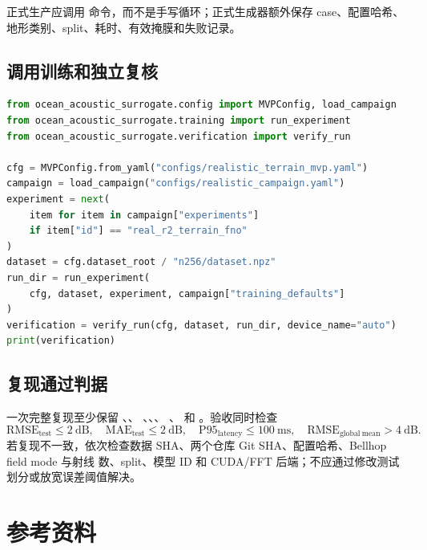 \documentclass[UTF8,11pt]{ctexart}
\newcommand{\RMSE}{\mathrm{RMSE}}
\begin{document}
正式生产应调用  命令，而不是手写循环；正式生成器额外保存 case、配置哈希、
地形类别、split、耗时、有效掩膜和失败记录。

\subsection{调用训练和独立复核}

\begin{lstlisting}[style=repro,language=Python]
from ocean_acoustic_surrogate.config import MVPConfig, load_campaign
from ocean_acoustic_surrogate.training import run_experiment
from ocean_acoustic_surrogate.verification import verify_run

cfg = MVPConfig.from_yaml("configs/realistic_terrain_mvp.yaml")
campaign = load_campaign("configs/realistic_campaign.yaml")
experiment = next(
    item for item in campaign["experiments"]
    if item["id"] == "real_r2_terrain_fno"
)
dataset = cfg.dataset_root / "n256/dataset.npz"
run_dir = run_experiment(
    cfg, dataset, experiment, campaign["training_defaults"]
)
verification = verify_run(cfg, dataset, run_dir, device_name="auto")
print(verification)
\end{lstlisting}

\subsection{复现通过判据}

一次完整复现至少保留 、、
、、、
、 和
。验收同时检查
\begin{equation}
  \RMSE_{\mathrm{test}}\le2\ \mathrm{dB},\quad
  \mathrm{MAE}_{\mathrm{test}}\le2\ \mathrm{dB},\quad
  \mathrm{P95}_{\mathrm{latency}}\le100\ \mathrm{ms},\quad
  \RMSE_{\mathrm{global\ mean}}>4\ \mathrm{dB}.
\end{equation}
若复现不一致，依次检查数据 SHA、两个仓库 Git SHA、配置哈希、Bellhop field mode 与射线
数、split、模型 ID 和 CUDA/FFT 后端；不应通过修改测试划分或放宽误差阈值解决。

\section{参考资料}
\end{document}
